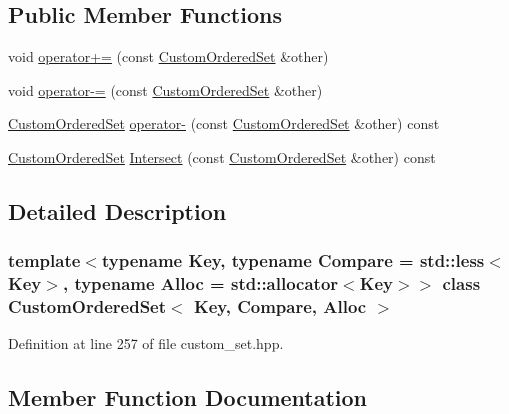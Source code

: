 \subsection*{Public Member Functions}
\begin{DoxyCompactItemize}
\item 
void \hyperlink{classCustomOrderedSet_a6a381bb474a00bb1f74c96e58f439732}{operator+=} (const \hyperlink{classCustomOrderedSet}{Custom\+Ordered\+Set} \&other)
\item 
void \hyperlink{classCustomOrderedSet_aa1e2187d66a483b1860700080cc6f513}{operator-\/=} (const \hyperlink{classCustomOrderedSet}{Custom\+Ordered\+Set} \&other)
\item 
\hyperlink{classCustomOrderedSet}{Custom\+Ordered\+Set} \hyperlink{classCustomOrderedSet_a4e843344380526ce70dffa839722ff52}{operator-\/} (const \hyperlink{classCustomOrderedSet}{Custom\+Ordered\+Set} \&other) const
\item 
\hyperlink{classCustomOrderedSet}{Custom\+Ordered\+Set} \hyperlink{classCustomOrderedSet_a1bfe8c8275f24bba87ddfca15bd5e23a}{Intersect} (const \hyperlink{classCustomOrderedSet}{Custom\+Ordered\+Set} \&other) const
\end{DoxyCompactItemize}


\subsection{Detailed Description}
\subsubsection*{template$<$typename Key, typename Compare = std\+::less$<$\+Key$>$, typename Alloc = std\+::allocator$<$\+Key$>$$>$\newline
class Custom\+Ordered\+Set$<$ Key, Compare, Alloc $>$}



Definition at line 257 of file custom\+\_\+set.\+hpp.



\subsection{Member Function Documentation}
\mbox{\label{classCustomOrderedSet_a1bfe8c8275f24bba87ddfca15bd5e23a}} 
